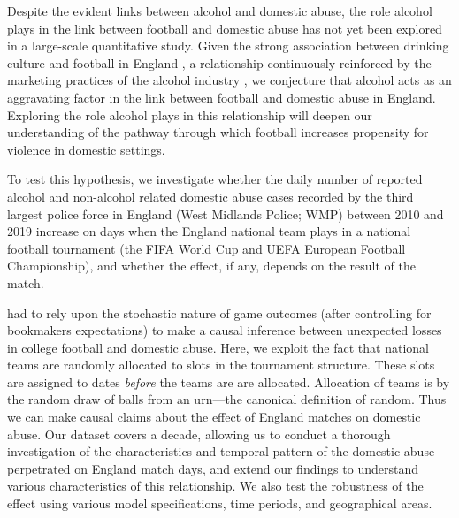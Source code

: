 \documentclass[12pt, a4paper]{article}
\begin{document}


Despite the evident links between alcohol and domestic abuse, the role alcohol plays in the link between football and domestic abuse has not yet been explored in a large-scale quantitative study. Given the strong association between drinking culture and football in England \cite{Dixon2014}, a relationship continuously reinforced by the marketing practices of the alcohol industry \cite{Gornall2014}, we conjecture that alcohol acts as an aggravating factor in the link between football and domestic abuse in England. Exploring the role alcohol plays in this relationship will deepen our understanding of the pathway through which football increases propensity for violence in domestic settings.

To test this hypothesis, we investigate whether the daily number of reported alcohol and non-alcohol related domestic abuse cases recorded by the third largest police force in England (West Midlands Police; WMP) between 2010 and 2019 increase on days when the England national team plays in a national football tournament (the FIFA World Cup and UEFA European Football Championship), and whether the effect, if any, depends on the result of the match.

 had to rely upon the stochastic nature of game outcomes (after controlling for bookmakers expectations) to make a causal inference between unexpected losses in college football and domestic abuse. 
Here, we exploit the fact that national teams are randomly allocated to slots in the tournament structure.
These slots are assigned to dates \emph{before} the teams are are allocated.
Allocation of teams is by the random draw of balls from an urn---the canonical definition of random. 
Thus we can make causal claims about the effect of England matches on domestic abuse.
Our dataset covers a decade, allowing us to conduct a thorough investigation of the characteristics and temporal pattern of the domestic abuse perpetrated on England match days, and extend our findings to understand various characteristics of this relationship. 
We also test the robustness of the effect using various model specifications, time periods, and geographical areas. 
\end{document}
